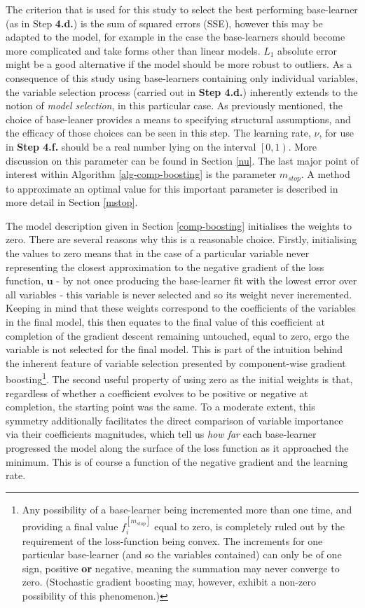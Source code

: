 \documentclass{article}
\begin{document}
\vspace{3mm}

The criterion that is used for this study to select the best performing base-learner (as in Step \textbf{4.d.}) is the sum of squared errors (SSE), however this may be adapted to the model, for example in the case the base-learners should become more complicated and take forms other than linear models. $L_1$ absolute error might be a good alternative if the model should be more robust to outliers.
As a consequence of this study using base-learners containing only individual variables, the variable selection process (carried out in \textbf{Step 4.d.}) inherently extends to the notion of \emph{model selection}, in this particular case. As previously mentioned, the choice of base-leaner provides a means to specifying structural assumptions, and the efficacy of those choices can be seen in this step. The learning rate, $\nu$, for use in \textbf{Step 4.f.} should be a real number lying on the interval $\left[0 , 1 \right)$. More discussion on this parameter can be found in Section \ref{nu}. The last major point of interest within Algorithm \eqref{alg-comp-boosting} is the parameter $m_{stop}$. A method to approximate an optimal value for this important parameter is described in more detail in Section \ref{mstop}.

The model description given in Section \ref{comp-boosting} initialises the weights to zero. There are several reasons why this is a reasonable choice. Firstly, initialising the values to zero means that in the case of a particular variable never representing the closest approximation to the negative gradient of the loss function, $\mathbf{u}$ - by not once producing the base-learner fit with the lowest error over all variables - this variable is never selected and so its weight never incremented. Keeping in mind that these weights correspond to the coefficients of the variables in the final model, this then equates to the final value of this coefficient at completion of the gradient descent remaining untouched, equal to zero, ergo the variable is not selected for the final model. This is part of the intuition behind the inherent feature of variable selection presented by component-wise gradient boosting\footnote{Any possibility of a base-learner being incremented more than one time, and providing a final value $f_{i}^{[m_{stop}]}$ equal to zero, is completely ruled out by the requirement of the loss-function being convex. The increments for one particular base-learner (and so the variables contained) can only be of one sign, positive \textbf{or} negative, meaning the summation may never converge to zero. (Stochastic gradient boosting may, however, exhibit a non-zero possibility of this phenomenon.)}.
The second useful property of using zero as the initial weights is that, regardless of whether a coefficient evolves to be positive or negative at completion, the starting point was the same. To a moderate extent, this symmetry additionally facilitates the direct comparison of variable importance via their coefficients magnitudes, which tell us \emph{how far} each base-learner progressed the model along the surface of the loss function as it approached the minimum. This is of course a function of the negative gradient and the learning rate.
\end{document}
